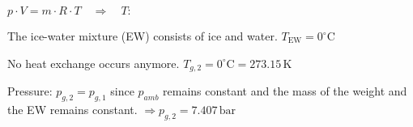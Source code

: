 \( p \cdot V = m \cdot R \cdot T \quad \Rightarrow \quad T: \)  

The ice-water mixture (EW) consists of ice and water.  
\( T_{\text{EW}} = 0^\circ \text{C} \)  

No heat exchange occurs anymore.  
\( T_{g,2} = 0^\circ \text{C} = 273.15 \, \text{K} \)  

Pressure:  
\( p_{g,2} = p_{g,1} \) since \( p_{amb} \) remains constant and the mass of the weight and the EW remains constant.  
\( \Rightarrow p_{g,2} = 7.407 \, \text{bar} \)